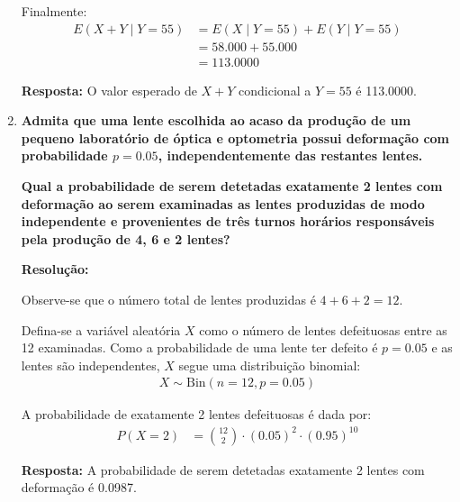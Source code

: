 \documentclass[a4paper,12pt]{article}
\begin{document}
\begin{enumerate}
\begin{mdframed}[backgroundcolor=gray!10, linewidth=0pt, innertopmargin=10pt, innerbottommargin=10pt]
  Finalmente:
  \begin{align*}
    E(X + Y \mid Y = 55) &= E(X \mid Y = 55) + E(Y \mid Y = 55) \\
    &= 58.000 + 55.000 \\
    &= 113.0000
  \end{align*}

  \textbf{Resposta:} O valor esperado de \( X + Y \) condicional a \( Y = 55 \) é 113.0000.
  \end{mdframed}

  \vspace{0.5cm}

  \item \textbf{Admita que uma lente escolhida ao acaso da produção de um pequeno laboratório de óptica e optometria possui deformação com probabilidade \( p = 0.05 \), independentemente das restantes lentes.}

  \textbf{Qual a probabilidade de serem detetadas exatamente 2 lentes com deformação ao serem examinadas as lentes produzidas de modo independente e provenientes de três turnos horários responsáveis pela produção de 4, 6 e 2 lentes?}

  \vspace{0.3cm}

  \begin{mdframed}[backgroundcolor=gray!10, linewidth=0pt, innertopmargin=10pt, innerbottommargin=10pt]
  \textbf{Resolução:}
  
  Observe-se que o número total de lentes produzidas é \( 4 + 6 + 2 = 12 \). 
  
  Defina-se a variável aleatória \( X \) como o número de lentes defeituosas entre as 12 examinadas. Como a probabilidade de uma lente ter defeito é \( p = 0.05 \) e as lentes são independentes, \( X \) segue uma distribuição binomial:
  \begin{align*}
    X \sim \text{Bin}(n = 12, p = 0.05)
  \end{align*}
  
  A probabilidade de exatamente 2 lentes defeituosas é dada por:
  \begin{align*}
    P(X = 2) &= \binom{12}{2} \cdot (0.05)^2 \cdot (0.95)^{10}
  \end{align*}
  
  \textbf{Resposta:} A probabilidade de serem detetadas exatamente 2 lentes com deformação é 0.0987.
  \end{mdframed}

  \vspace{0.5cm}


\end{enumerate}
\end{document}
